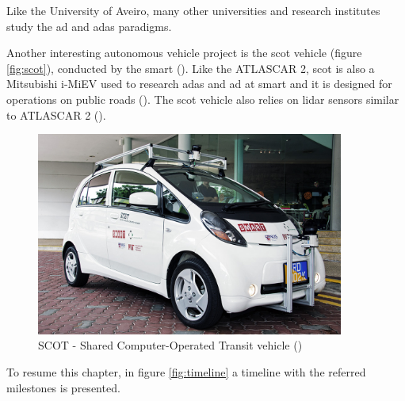 Like the University of Aveiro, many other universities and research institutes study the \gls{ad} and \gls{adas} paradigms.

Another interesting autonomous vehicle project is the \gls{scot} vehicle (figure \ref{fig:scot}), conducted by the \gls{smart} (\cite{Singapore-MITAllianceforResearchandTechnology}). Like the ATLASCAR 2, \gls{scot} is also a Mitsubishi i-MiEV used to research \gls{adas} and \gls{ad} at \gls{smart} and it is designed for operations on public roads (\cite{AndreasHerrmannWalterBrenner2018}). The \gls{scot} vehicle also relies on \gls{lidar} sensors similar to ATLASCAR 2 (\cite{Teo}). 

\begin{figure}[htp]
	
	\centering
	\includegraphics[width=0.9\textwidth]{capstate/imgs/scot}
	
	\caption{SCOT - Shared Computer-Operated Transit vehicle (\cite{Singapore-MITAllianceforResearchandTechnology})}
	\label{fig:sot}
	
\end{figure}

To resume this chapter, in figure \ref{fig:timeline} a timeline with the referred milestones is presented.

